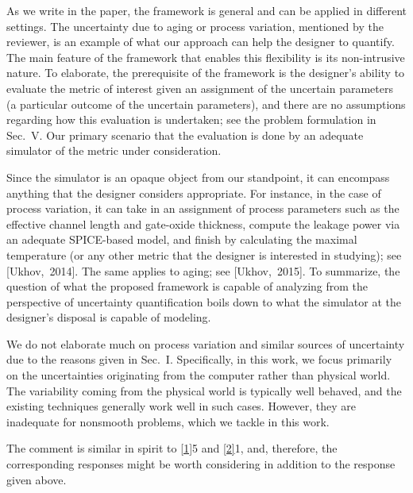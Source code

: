 \begin{authors}
As we write in the paper, the framework is general and can be applied in
different settings. The uncertainty due to aging or process variation, mentioned
by the reviewer, is an example of what our approach can help the designer to
quantify. The main feature of the framework that enables this flexibility is its
non-intrusive nature. To elaborate, the prerequisite of the framework is the
designer's ability to evaluate the metric of interest given an assignment of the
uncertain parameters (a particular outcome of the uncertain parameters), and
there are no assumptions regarding how this evaluation is undertaken; see the
problem formulation in Sec.~V. Our primary scenario that the evaluation is done
by an adequate simulator of the metric under consideration.

Since the simulator is an opaque object from our standpoint, it can encompass
anything that the designer considers appropriate. For instance, in the case of
process variation, it can take in an assignment of process parameters such as
the effective channel length and gate-oxide thickness, compute the leakage power
via an adequate SPICE-based model, and finish by calculating the maximal
temperature (or any other metric that the designer is interested in studying);
see [Ukhov,~2014]. The same applies to aging; see [Ukhov,~2015]. To summarize,
the question of what the proposed framework is capable of analyzing from the
perspective of uncertainty quantification boils down to what the simulator at
the designer's disposal is capable of modeling.

We do not elaborate much on process variation and similar sources of uncertainty
due to the reasons given in Sec.~I. Specifically, in this work, we focus
primarily on the uncertainties originating from the computer rather than
physical world. The variability coming from the physical world is typically well
behaved, and the existing techniques generally work well in such cases. However,
they are inadequate for nonsmooth problems, which we tackle in this work.

The comment is similar in spirit to \cref{1}{5} and \cref{2}{1}, and, therefore,
the corresponding responses might be worth considering in addition to the
response given above.

\begin{actions}

\end{actions}
\end{authors}

